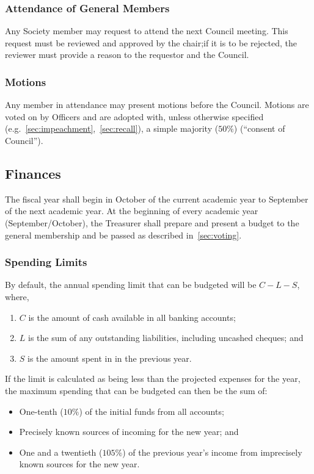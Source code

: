 \subsubsection{Attendance of General Members}
Any Society member may request to attend the next Council meeting. This request
must be reviewed and approved by the chair;\@ if it is to be rejected, the
reviewer must provide a reason to the requestor and the Council.

\subsubsection{Motions}
Any member in attendance may present motions before the Council. Motions are
voted on by Officers and are adopted with, unless otherwise specified
(e.g.~\ref{sec:impeachment},~\ref{sec:recall}), a simple majority ($50\%$)
(``consent of Council'').

\subsection{Finances}\label{sec:finances}
The fiscal year shall begin in October of the current academic year to
September of the next academic year. At the beginning of every academic year
(September/October), the Treasurer shall prepare and present a budget to the
general membership and be passed as described in~\ref{sec:voting}.

\subsubsection{Spending Limits}
By default, the annual spending limit that can be budgeted will be $C - L - S$,
where,
\begin{enumerate}
      \item $C$ is the amount of cash available in all banking accounts;
      \item $L$ is the sum of any outstanding liabilities, including uncashed cheques; and
      \item $S$ is the amount spent in in the previous year.
\end{enumerate}
If the limit is calculated as being less than the projected expenses for the year, the maximum spending that can be budgeted can then be the sum of:

\begin{itemize}
      \item One-tenth ($10\%$) of the initial funds from all accounts;
      \item Precisely known sources of incoming for the new year; and
      \item One and a twentieth ($105\%$) of the previous year's income from imprecisely
            known sources for the new year.
\end{itemize}

